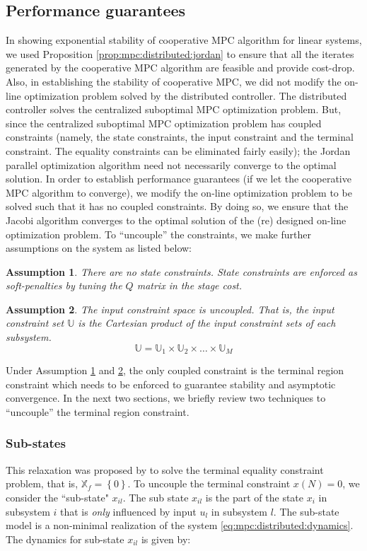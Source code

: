 \documentclass[10pt]{article}
\newcommand{\set}[1]{\left\lbrace #1 \right\rbrace}
\newtheorem{assumption}{Assumption}
\theoremstyle{definition}
\begin{document}
\subsection{Performance guarantees}
In showing exponential stability of cooperative MPC algorithm for
linear systems, we used Proposition \ref{prop:mpc:distributed:jordan}
to ensure that all the iterates generated by the cooperative MPC
algorithm are feasible and provide cost-drop. Also, in establishing
the stability of cooperative MPC, we did not modify the on-line
optimization problem solved by the distributed controller. The
distributed controller solves the centralized suboptimal MPC
optimization problem. But, since the centralized suboptimal MPC
optimization problem has coupled constraints (namely, the state
constraints, the input constraint and the terminal constraint. The equality constraints can be eliminated fairly easily); the Jordan parallel optimization
algorithm need not necessarily converge to the optimal
solution. In order to establish performance guarantees (if we let the
cooperative MPC algorithm to converge), we modify the on-line
optimization problem to be solved such that it has no coupled
constraints. By doing so, we ensure that the Jacobi algorithm
converges to the optimal solution of the (re) designed on-line
optimization problem. To ``uncouple'' the constraints, we make further
assumptions on the system as listed below:

\begin{assumption}
\label{ass:noX}
There are no state constraints. State constraints are enforced as
soft-penalties by tuning the $Q$ matrix in the stage cost.
\end{assumption}

\begin{assumption}
\label{ass:uncoupledU}
The input constraint space is uncoupled. That is, the input constraint
set $\mathbb{U}$ is the Cartesian product of the input constraint sets
of each subsystem. 
\[ \mathbb{U} = \mathbb{U}_1 \times \mathbb{U}_2 \times \ldots \times
\mathbb{U}_M
\]
\end{assumption}

Under Assumption \ref{ass:noX} and \ref{ass:uncoupledU}, the only
coupled constraint is the terminal region
constraint which needs to be enforced to guarantee stability and
asymptotic convergence. In the next two sections, we briefly review
two techniques to ``uncouple'' the terminal region constraint.

\subsubsection{Sub-states}
\label{sec:substate}
This relaxation was proposed by \citet{stewart:venkat:rawlings:wright:pannocchia:2010} to solve the terminal equality constraint problem, that is,  $\mathbb{X}_f = \set{0}$.  To uncouple the terminal constraint $x(N) = 0$, we consider the ``sub-state" $x_{il}$. The sub state $x_{il}$ is the part of the state $x_i$ in subsystem $i$ that is {\emph{only}} influenced by input $u_l$ in subsystem $l$.  The sub-state model is a non-minimal realization of the system \eqref{eq:mpc:distributed:dynamics}.  The dynamics for sub-state $x_{il}$ is given by:
\end{document}
